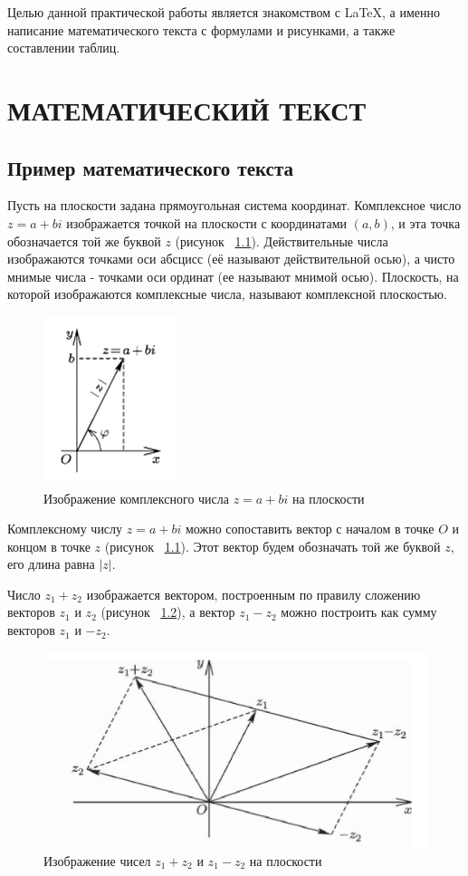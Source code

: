 \documentclass[14pt]{extreport}
\begin{document}
\pagestyle{empty} %


\pagestyle{plain} %
\tableofcontents

\intro

Целью данной практической работы является знакомством с LaTeX, а именно написание математического текста с формулами и рисунками, а также составлении таблиц.

\chapter{МАТЕМАТИЧЕСКИЙ ТЕКСТ\label{chapter2}}
\section{Пример математического текста}

Пусть на плоскости задана прямоугольная система координат. Комплексное число $z=a+bi$ изображается точкой на плоскости с координатами $(a, b)$, и эта точка обозначается той же буквой $z$ (рисунок ~\ref{fig1}). Действительные числа изображаются точками оси абсцисс (её называют действительной осью), а чисто мнимые числа - точками оси ординат (ее называют мнимой осью). Плоскость, на которой изображаются комплексные числа, называют комплексной плоскостью.
\begin{figure}[H]
\centerline{\includegraphics[width=0.25\linewidth]{pic1}}
\caption{Изображение комплексного числа $z=a+bi$ на плоскости}
\label{fig1}
\end{figure}
Комплексному числу $z=a+bi$ можно сопоставить вектор с началом в точке $O$ и концом в точке $z$ (рисунок ~\ref{fig1}). Этот вектор будем обозначать той же буквой $z$, его длина равна $|z|$.

Число $z_1 + z_2$ изображается вектором, построенным по правилу сложению векторов $z_1$ и $z_2$ (рисунок ~\ref{fig2}), а вектор $z_1 - z_2$ можно построить как сумму векторов $z_1$ и $-z_2$.
\begin{figure}[H]
\centerline{\includegraphics[width=0.5\linewidth]{pic2}}
\caption{Изображение чисел $z_1 + z_2$ и $z_1 - z_2$ на плоскости}
\label{fig2}
\end{figure}
\end{document}
